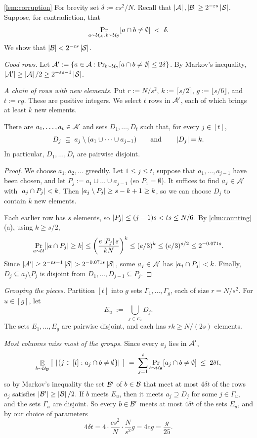 \begin{proofof}{\cref{lem:corruption}}
For brevity set $\delta := c s^2/N$. Recall that $\left|\mathcal{A}\right|, \left|\mathcal{B}\right| \ge 2^{-\varepsilon s}\left|\mathcal{S}\right|$. Suppose, for contradiction, that
\[ \Pr_{a \sim \mathcal{U}_{\mathcal{A}},\, b \sim \mathcal{U}_{\mathcal{B}}}[a \cap b \ne \emptyset] \;<\; \delta. \]
We show that $\left|\mathcal{B}\right| < 2^{-\varepsilon s}\left|\mathcal{S}\right|$.

\emph{Good rows.} Let $\mathcal{A}' := \{a \in \mathcal{A} : \Pr_{b \sim \mathcal{U}_{\mathcal{B}}}[a \cap b \ne \emptyset] \le 2\delta\}$. By Markov's inequality, $\left|\mathcal{A}'\right| \ge \left|\mathcal{A}\right|/2 \ge 2^{-\varepsilon s - 1}\left|\mathcal{S}\right|$.

\emph{A chain of rows with new elements.} Put $r:=N/s^2$, $k:=\lceil s/2\rceil$, $g:=\lfloor s/6\rfloor$, and $t:=rg$. These are positive integers. We select $t$ rows in $\mathcal{A}'$, each of which brings at least $k$ new elements.

\begin{claim}\label{clm:spread}
There are $a_1, \dots, a_t \in \mathcal{A}'$ and sets $D_1, \dots, D_t$ such that, for every $j \in [t]$,
\[ D_j \;\subseteq\; a_j \setminus (a_1 \cup \dots \cup a_{j-1}) \qquad\text{and}\qquad \left|D_j\right| = k. \]
In particular, $D_1, \dots, D_t$ are pairwise disjoint.
\end{claim}
\begin{proof}
We choose $a_1, a_2, \dots$ greedily. Let $1 \le j \le t$, suppose that $a_1, \dots, a_{j-1}$ have been chosen, and let $P_j := a_1 \cup \dots \cup a_{j-1}$ (so $P_1 = \emptyset$). It suffices to find $a_j\in\mathcal{A}'$ with $\left|a_j\cap P_j\right|<k$. Then $\left|a_j\setminus P_j\right|\ge s-k+1\ge k$, so we can choose $D_j$ to contain $k$ new elements.

Each earlier row has $s$ elements, so $\left|P_j\right|\le(j-1)s<ts\le N/6$. By \cref{clm:counting}(a), using $k\ge s/2$,
\[
\Pr_{a\sim\mathcal{U}}[\left|a\cap P_j\right|\ge k]
\le\left(\frac{e\left|P_j\right|s}{kN}\right)^k
\le(e/3)^k\le(e/3)^{s/2}\le2^{-0.071s}.
\]
Since $\abs{\cA'}\ge2^{-\eps s-1}\abs\cS>2^{-0.071s}\abs\cS$, some $a_j\in\mathcal{A}'$ has $\left|a_j\cap P_j\right|<k$. Finally, $D_j \subseteq a_j \setminus P_j$ is disjoint from $D_1, \dots, D_{j-1} \subseteq P_j$.
\end{proof}

\emph{Grouping the pieces.} Partition $[t]$ into $g$ sets $\Gamma_1,\dots,\Gamma_g$, each of size $r=N/s^2$. For $u \in [g]$, let
\[ E_u \;:=\; \bigcup_{j \in \Gamma_u} D_j. \]
The sets $E_1, \dots, E_g$ are pairwise disjoint, and each has $rk\ge N/(2s)$ elements.

\emph{Most columns miss most of the groups.} Since every $a_j$ lies in $\mathcal{A}'$,
\[ \mathop{\mathbb{E}}_{b \sim \mathcal{U}_{\mathcal{B}}}\big[\,\left|\{j \in [t] : a_j \cap b \ne \emptyset\}\right|\,\big] \;=\; \sum_{j=1}^{t}\Pr_{b \sim \mathcal{U}_{\mathcal{B}}}[a_j \cap b \ne \emptyset] \;\le\; 2\delta t, \]
so by Markov's inequality the set $\mathcal{B}'$ of $b \in \mathcal{B}$ that meet at most $4\delta t$ of the rows $a_j$ satisfies $\left|\mathcal{B}'\right| \ge \left|\mathcal{B}\right|/2$. If $b$ meets $E_u$, then it meets $a_j \supseteq D_j$ for some $j \in \Gamma_u$, and the sets $\Gamma_u$ are disjoint. So every $b \in \mathcal{B}'$ meets at most $4\delta t$ of the sets $E_u$, and by our choice of parameters
\[4\delta t=4\cdot\frac{cs^2}{N}\cdot\frac{N}{s^2}g=4cg=\frac{g}{25}.\]


\end{proofof}
